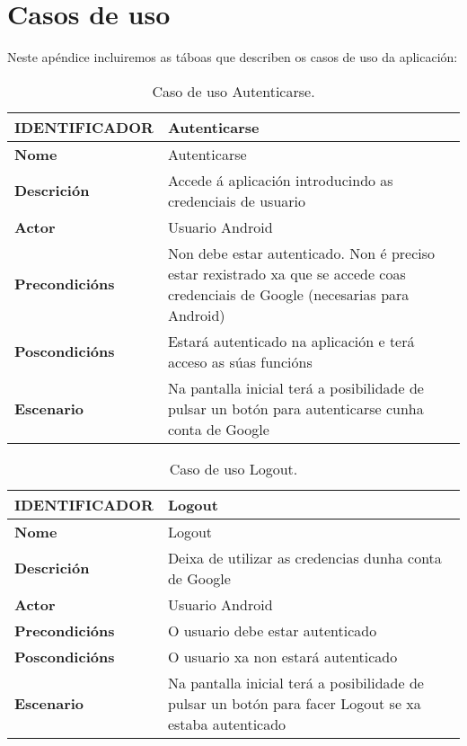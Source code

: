 \chapter{Casos de uso}

Neste apéndice incluiremos as táboas que describen os casos de uso da aplicación:

\begin{table} [tbh]
	\begin{tabular}{|l|p{10cm}|}
		\hline 
		\textbf{IDENTIFICADOR}	& \textbf{Autenticarse} \\ 
		\hline 
		\textbf{Nome} & Autenticarse \\ 
		\hline 
		\textbf{Descrición} & Accede á aplicación introducindo as credenciais de usuario \\ 
		\hline 
		\textbf{Actor} & Usuario Android \\ 
		\hline 
		\textbf{Precondicións} & Non debe estar autenticado. Non é preciso estar rexistrado xa que se accede coas credenciais de Google (necesarias para Android) \\ 
		\hline 
		\textbf{Poscondicións} & Estará autenticado na aplicación e terá acceso as súas funcións \\ 
		\hline 
		\textbf{Escenario} & Na pantalla inicial terá a posibilidade de pulsar un botón para autenticarse cunha conta de Google \\ 
		\hline 
	\end{tabular}
	\caption{Caso de uso Autenticarse.}
	\label{tab:cuAutenticar}
\end{table}

\begin{table} [tbh]
	\begin{tabular}{|l|p{10cm}|}
		\hline 
		\textbf{IDENTIFICADOR}	& \textbf{Logout} \\ 
		\hline 
		\textbf{Nome} & Logout \\ 
		\hline 
		\textbf{Descrición} & Deixa de utilizar as credencias dunha conta de Google \\ 
		\hline 
		\textbf{Actor} & Usuario Android \\ 
		\hline 
		\textbf{Precondicións} & O usuario debe estar autenticado \\ 
		\hline 
		\textbf{Poscondicións} & O usuario xa non estará autenticado \\ 
		\hline 
		\textbf{Escenario} & Na pantalla inicial terá a posibilidade de pulsar un botón para facer Logout se xa estaba autenticado \\ 
		\hline 
	\end{tabular}
	\caption{Caso de uso Logout.}
	\label{tab:cuLogout}
\end{table}

